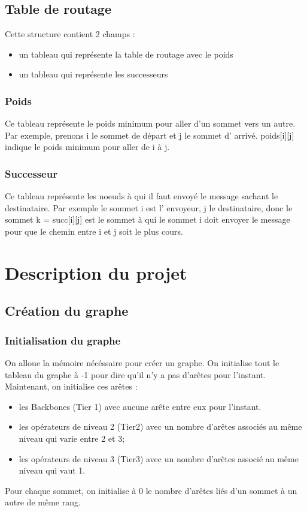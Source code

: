 \documentclass[a4paper,11pt]{report}
\begin{document}
\section{Table de routage}

Cette structure contient 2 champs : 
\begin{itemize}
    \item un tableau qui représente la table de routage avec le poids
    \item un tableau qui représente les successeurs 
\end{itemize}

\subsection{Poids}

Ce tableau représente le poids minimum pour aller d'un sommet vers un autre. Par exemple, prenons i le sommet de départ et j le sommet d' arrivé. poids[i][j] indique le poids minimum pour aller de i à j.

\subsection{Successeur}

Ce tableau représente les noeuds à qui il faut envoyé le message sachant le destinataire. Par exemple le sommet i est l' envoyeur, j le destinataire, donc le sommet k = succ[i][j] est le sommet à qui le sommet i doit envoyer le message pour que le chemin entre i et j soit le plus cours.

\chapter{Description du projet}

\section{Création du graphe}

\subsection{Initialisation du graphe}
On alloue la mémoire nécéssaire pour créer un graphe. On initialise tout le tableau du graphe à -1 pour dire qu'il n'y a pas d'arêtes pour l'instant. Maintenant, on initialise ces arêtes :
\begin{itemize}
\item les Backbones (Tier 1) avec aucune arête entre eux pour l'instant.
\item les opérateurs de niveau 2 (Tier2) avec un nombre d'arêtes associés au même niveau qui varie entre 2 et 3;
\item les opérateurs de niveau 3 (Tier3) avec un nombre d'arêtes associé au même niveau qui vaut 1.
\end{itemize}
Pour chaque sommet, on initialise à 0 le nombre d'arêtes liés d'un sommet à un autre de même rang.
\end{document}
